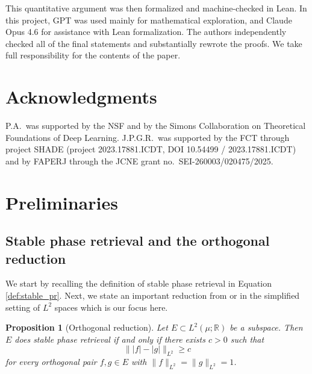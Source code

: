 \documentclass[11pt]{amsart}
\numberwithin{equation}{section}
\newtheorem{proposition}[theorem]{Proposition}
\theoremstyle{definition}
\newtheorem{definition}[theorem]{Definition}
\theoremstyle{remark}
\newcommand{\abs}[1]{\lvert #1 \rvert}
\newcommand{\norm}[1]{\lVert #1 \rVert}
\begin{document}
This quantitative argument was then formalized and machine-checked in Lean. In this project, GPT was used mainly for mathematical exploration, and Claude Opus 4.6 for assistance with Lean formalization. The authors independently checked all of the final statements and  substantially rewrote the proofs. We take full responsibility for the contents of the paper. 

\section*{Acknowledgments} 

P.A.~was supported by the NSF and by the Simons Collaboration on Theoretical Foundations of Deep Learning. J.P.G.R.~was supported by the FCT through project SHADE (project 2023.17881.ICDT, DOI  10.54499 / 2023.17881.ICDT) and by FAPERJ through the JCNE grant no.~SEI-260003/020475/2025.

\section{Preliminaries}\label{sec:preliminaries}

\subsection{Stable phase retrieval and the orthogonal reduction} We start by recalling the definition of stable phase retrieval in  Equation \ref{def:stable_pr}. Next, we state an important reduction from \cite[Theorem~3.9]{FOTP} or  \cite[Theorem~2.1]{localphase} in the simplified setting of $L^2$ spaces which is our focus here. 



\begin{proposition}[Orthogonal reduction]\label{prop:orth-reduction}
Let $E\subset L^2(\mu;\mathbb{R})$ be a subspace. Then $E$
does stable phase retrieval if and only if there exists $c>0$ such that
\[
\norm{\abs{f}-\abs{g}}_{L^2}\ge c
\]
for every orthogonal pair $f,g\in E$ with $\norm{f}_{L^2}=\norm{g}_{L^2}=1$. 
\end{proposition}
\end{document}
